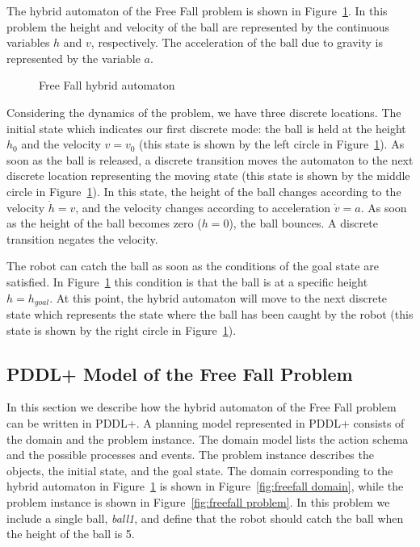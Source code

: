 The hybrid automaton of the Free Fall problem is shown in Figure~\ref{fig:Free Fall hybrid automaton}. In this problem the height and velocity of the ball are represented by the continuous variables $h$ and $v$, respectively. The acceleration of the ball due to gravity is represented by the variable $a$.

\begin{figure}[ht]
\centering

\caption{Free Fall hybrid automaton}
\label{fig:Free Fall hybrid automaton}
\end{figure}

Considering the dynamics of the problem, we have three discrete locations. The initial state which indicates our first discrete mode: the ball is held at the height $h_0$ and the velocity $v = v_0$ (this state is shown by the left circle in Figure~\ref{fig:Free Fall hybrid automaton}). As soon as the ball is released, a discrete transition moves the automaton to the next discrete location representing the moving state (this state is shown by the middle circle in Figure~\ref{fig:Free Fall hybrid automaton}). In this state, the height of the ball changes according to the velocity $\dot{h}=v$, and the velocity changes according to acceleration $\dot{v}=a$. As soon as the height of the ball becomes zero ($h=0$), the ball bounces. A discrete transition negates the velocity.

The robot can catch the ball as soon as the conditions of the goal state are satisfied. In Figure~\ref{fig:Free Fall hybrid automaton} this condition is that the ball is at a specific height $h=h_{goal}$. At this point, the hybrid automaton will move to the next discrete state which represents the state where the ball has been caught by the robot (this state is shown by the right circle in Figure~\ref{fig:Free Fall hybrid automaton}).

\subsection{PDDL+ Model of the Free Fall Problem}

In this section we describe how the hybrid automaton of the Free Fall problem can be written in PDDL+. A planning model represented in PDDL+ consists of the domain and the problem instance. The domain model lists the action schema and the possible processes and events. The problem instance describes the objects, the initial state, and the goal state. The domain corresponding to the hybrid automaton in Figure~\ref{fig:Free Fall hybrid automaton} is shown in Figure~\ref{fig:freefall domain}, while the problem instance is shown in Figure~\ref{fig:freefall problem}. In this problem we include a single ball, \textit{ball1}, and define that the robot should catch the ball when the height of the ball is 5.

